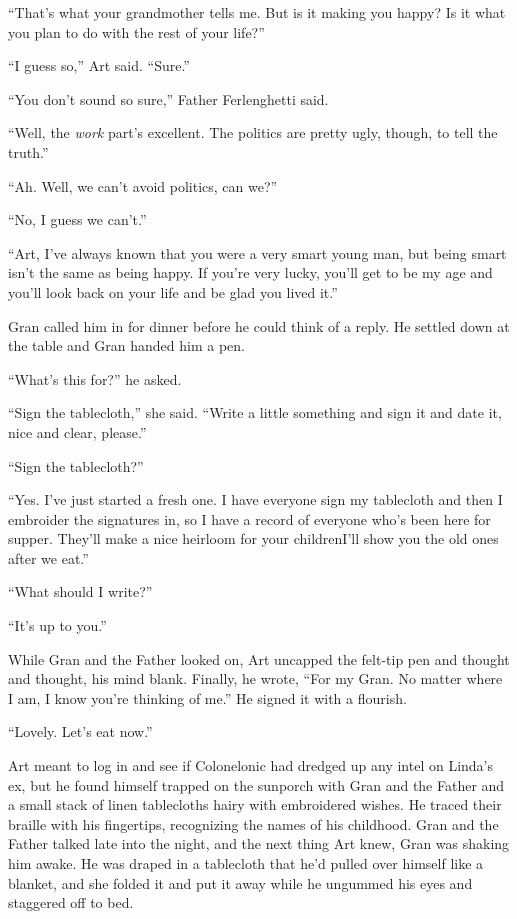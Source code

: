 “That’s what your grandmother tells me. But is it making you happy?
Is it what you plan to do with the rest of your life?”

“I guess so,” Art said. “Sure.”

“You don’t sound so sure,” Father Ferlenghetti said.

“Well, the \emph{work} part’s excellent. The politics are pretty
ugly, though, to tell the truth.”

“Ah. Well, we can’t avoid politics, can we?”

“No, I guess we can’t.”

“Art, I’ve always known that you were a very smart young man, but
being smart isn’t the same as being happy. If you’re very lucky,
you’ll get to be my age and you’ll look back on your life and be
glad you lived it.”

Gran called him in for dinner before he could think of a reply. He
settled down at the table and Gran handed him a pen.

“What’s this for?” he asked.

“Sign the tablecloth,” she said. “Write a little something and sign
it and date it, nice and clear, please.”

“Sign the tablecloth?”

“Yes. I’ve just started a fresh one. I have everyone sign my
tablecloth and then I embroider the signatures in, so I have a
record of everyone who’s been here for supper. They’ll make a nice
heirloom for your children{\dash}I’ll show you the old ones after we
eat.”

“What should I write?”

“It’s up to you.”

While Gran and the Father looked on, Art uncapped the felt-tip pen
and thought and thought, his mind blank. Finally, he wrote, “For my
Gran. No matter where I am, I know you’re thinking of me.” He
signed it with a flourish.

“Lovely. Let’s eat now.”

Art meant to log in and see if Colonelonic had dredged up any intel
on Linda’s ex, but he found himself trapped on the sunporch with
Gran and the Father and a small stack of linen tablecloths hairy
with embroidered wishes. He traced their braille with his
fingertips, recognizing the names of his childhood. Gran and the
Father talked late into the night, and the next thing Art knew,
Gran was shaking him awake. He was draped in a tablecloth that he’d
pulled over himself like a blanket, and she folded it and put it
away while he ungummed his eyes and staggered off to bed.

